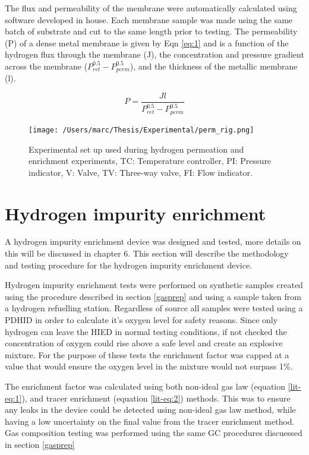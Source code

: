 The flux and permeability of the membrane were automatically calculated using software developed in house. Each membrane sample was made using the same batch of substrate and cut to the same length prior to testing. The permeability (P)  of a dense metal membrane is given by Eqn \ref{eq:1} \cite{NathanW.Ockwig2007} and is a function of the hydrogen flux through the membrane (J), the concentration and pressure gradient across the membrane ($P^{0.5}_{ret}-P^{0.5}_{perm}$), and the thickness of the metallic membrane (l). 

\begin{equation} \label{eq:1}
    P = \frac{J l}{P^{0.5}_{ret}-P^{0.5}_{perm}}
\end{equation}

\begin{landscape}
\begin{figure}[h]
  \centering
  \texttt{[image: /Users/marc/Thesis/Experimental/perm\_rig.png]}
  \caption{Experimental set up used during hydrogen permeation and enrichment experiments, TC: Temperature controller, PI: Pressure indicator, V: Valve, TV: Three-way valve,  FI: Flow indicator.}
  \label{testrig}
\end{figure}

\end{landscape}

\section{Hydrogen impurity enrichment}\label{enrichproc}
A hydrogen impurity enrichment device was designed and tested, more details on this will be discussed in chapter 6. This section will describe the methodology and testing procedure for the hydrogen impurity enrichment device. 

Hydrogen impurity enrichment tests were performed on synthetic samples created using the procedure described in section \ref{gasprep} and using a sample taken from a hydrogen refuelling station. Regardless of source all samples were tested using a PDHID in order to calculate it's oxygen level for safety reasons. Since only hydrogen can leave the HIED in normal testing conditions, if not checked the concentration of oxygen could rise above a safe level and create an explosive mixture. For the purpose of these tests the enrichment factor was capped at a value that would ensure the oxygen level in the mixture would not surpass 1\%. 

The enrichment factor was calculated using both non-ideal gas law (equation \ref{lit-eq:1}), and tracer enrichment (equation \ref{lit-eq:2}) methods. This was to ensure any leaks in the device could be detected using non-ideal gas law method, while having a low uncertainty on the final value from the tracer enrichment method. Gas composition testing was performed using the same GC procedures discuessed in section \ref{gasprep}
